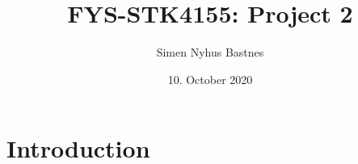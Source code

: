 \documentclass[a4paper]{article}
\title{FYS-STK4155: Project 2}
\author{Simen Nyhus Bastnes}
\date{10. October 2020}
\begin{document}
\maketitle
\begin{abstract}

\end{abstract}
\section{Introduction}
\end{document}
